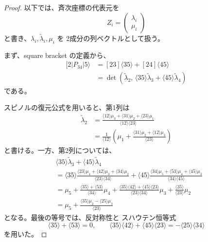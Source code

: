 \documentclass[uplatex,dvipdfmx,a4paper,11pt]{jsarticle}
\renewcommand{\proofname}{Proof}
\newenvironment{myproof}[1][\proofname]
  {\begin{proof}[#1]}
  {\end{proof}}
\numberwithin{equation}{section}
\begin{document}
\begin{myproof}
  以下では、斉次座標の代表元を
  \[
    Z_i=
    \begin{pmatrix}
      \lambda_i\\
      \mu_i
    \end{pmatrix}
  \]
  と書き、$\lambda_i,\widetilde\lambda_i,\mu_i$ を
  2成分の列ベクトルとして扱う。

  まず、square bracket の定義から、
  \[
    \begin{aligned}
      [2|P_{34}|5\rangle
      &=[23]\langle35\rangle+[24]\langle45\rangle\\
      &=\det\!\left(
        \widetilde\lambda_2,\,
        \langle35\rangle\widetilde\lambda_3
        +\langle45\rangle\widetilde\lambda_4
      \right)
    \end{aligned}
  \]
  である。

  スピノルの復元公式を用いると、第1列は
  \[
    \begin{aligned}
      \widetilde\lambda_2
      &=
      \frac{
        \langle12\rangle\mu_3
        +\langle31\rangle\mu_2
        +\langle23\rangle\mu_1
      }{
        \langle12\rangle\langle23\rangle
      }\\
      &=
      \frac{1}{\langle12\rangle}
      \left(
        \mu_1+
        \frac{
          \langle31\rangle\mu_2+\langle12\rangle\mu_3
        }{\langle23\rangle}
      \right)
    \end{aligned}
  \]
  と書ける。一方、第2列については、
  \[
    \begin{aligned}
      &\langle35\rangle\widetilde\lambda_3
        +\langle45\rangle\widetilde\lambda_4\\
      &=
      \langle35\rangle
      \frac{
        \langle23\rangle\mu_4
        +\langle42\rangle\mu_3
        +\langle34\rangle\mu_2
      }{
        \langle23\rangle\langle34\rangle
      }
      +
      \langle45\rangle
      \frac{
        \langle34\rangle\mu_5
        +\langle53\rangle\mu_4
        +\langle45\rangle\mu_3
      }{
        \langle34\rangle\langle45\rangle
      }\\
      &=
      \mu_5
      +\frac{\langle35\rangle+\langle53\rangle}
             {\langle34\rangle}\mu_4
      +\frac{
        \langle35\rangle\langle42\rangle
        +\langle45\rangle\langle23\rangle
      }{
        \langle23\rangle\langle34\rangle
      }\mu_3
      +\frac{\langle35\rangle}{\langle23\rangle}\mu_2\\
      &=
      \mu_5+
      \frac{
        \langle35\rangle\mu_2-\langle25\rangle\mu_3
      }{\langle23\rangle}
    \end{aligned}
  \]
  となる。最後の等号では、反対称性と
  スハウテン恒等式
  \[
    \langle35\rangle+\langle53\rangle=0,
    \qquad
    \langle35\rangle\langle42\rangle
    +\langle45\rangle\langle23\rangle
    =-\langle25\rangle\langle34\rangle
  \]
  を用いた。


\end{myproof}
\end{document}
